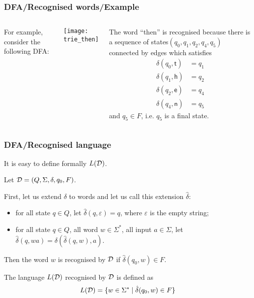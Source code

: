 % 
\begin{frame}
\frametitle{DFA/Recognised words/Example}

\begin{columns}
  For example, consider the following DFA:
  \begin{center}
    \texttt{[image: trie\_then]}
  \end{center}

   The word ``\textsf{then}'' is recognised
  because there is a sequence of states\linebreak\((q_0, q_1, q_2, q_4, q_5)\)
  connected by edges which satisfies
  \begin{align*}
    \delta (q_0, \textsf{t}) &= q_1\\
    \delta (q_1, \textsf{h}) &= q_2\\
    \delta (q_2, \textsf{e}) &= q_4\\
    \delta (q_4, \textsf{n}) &= q_5
  \end{align*}
  and \(q_5 \in F\), i.e. \(q_5\) is a final state.
\end{columns}

\end{frame}

% 
\begin{frame}
\frametitle{DFA/Recognised language}

It is easy to define formally \(L({\cal D})\).

\bigskip

Let \({\cal D} = (Q, \Sigma, \delta, q_0, F)\).

\bigskip

First, let us extend \(\delta\) to words and let us call this
extension \(\hat{\delta}\):
\begin{itemize}

  \item for all state \(q \in Q\), let \(\hat{\delta} (q,
  \varepsilon) = q\), where \(\varepsilon\) is the empty string;

  \item for all state \(q \in Q\), all word \(w \in \Sigma^{*}\), all
 input \(a \in \Sigma\), let \(\hat{\delta} (q, wa) = \delta
 (\hat{\delta}(q,w),a)\).

\end{itemize}
Then the word \(w\) is recognised by \(\cal D\) if \(\hat{\delta}(q_0,
w) \in F\).

The language \(L({\cal D})\) recognised by \(\cal D\) is defined as
\[
L({\cal D}) = \{w \in \Sigma^{*} \; \lvert \; \hat{\delta}(q_0, w) \in F\}
\]

\end{frame}

